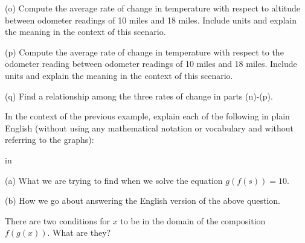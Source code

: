 \documentclass{ximera}
\newcommand{\pskip}{\vskip 0.1 in}
\begin{document}
\begin{example}
(o) Compute the average rate of change in temperature with respect to altitude between odometer readings of 10 miles and 18 miles. Include units and explain the meaning in the context of this scenario.

(p) Compute the average rate of change in temperature with respect to the odometer reading between odometer readings of 10 miles and 18 miles. Include units and explain the meaning in the context of this scenario.

(q) Find a relationship among the three rates of change in parts (n)-(p).


\begin{exploration}\label{Exp3:Comp}

 
\begin{onlineOnly}
    \begin{center}
\end{center}
\end{onlineOnly}
\end{exploration}

\end{example}



\begin{example} \label{Ex4:Comp}
In the context of the previous example, explain each of the following in plain English (without using any mathematical notation or vocabulary and without referring to the graphs):

\pskip

(a) What we are trying to find when we solve the equation $g(f(s)) = 10$.

(b) How we go about answering the English version of the above question.

\end{example}


\begin{question}   \label{Q1:Comp}
There are two conditions for $x$ to be in the domain of the composition $f(g(x))$. What are they?
\end{question}
\end{document}
